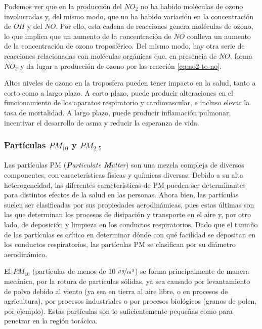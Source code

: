 \documentclass[12pt]{article}
\begin{document}
Podemos ver que en la producción del $NO_{2}$ no ha habido moléculas de ozono involucradas y, del mismo modo, que no ha habido variación en la concentración de $OH$ y del $NO$. Por ello, esta cadena de reacciones genera moléculas de ozono, lo que implica que un aumento de la concentración de $NO$ conlleva un aumento de la concentración de ozono troposférico. Del mismo modo, hay otra serie de reacciones relacionadas con moléculas orgánicas que, en presencia de $NO$, forma $NO_{2}$ y da lugar a producción de ozono por las reacción \ref{eq:no2-to-no}.

Altos niveles de ozono en la troposfera pueden tener impacto en la salud, tanto a corto como a largo plazo. A corto plazo, puede producir alteraciones en el funcionamiento de los aparatos respiratorio y cardiovascular, e incluso elevar la tasa de mortalidad. A largo plazo, puede producir inflamación pulmonar, incentivar el desarrollo de asma y reducir la esperanza de vida. 

\subsubsection*{Partículas \textbf{\texorpdfstring{$PM_{10}$}{PM10}} y \textbf{\texorpdfstring{$PM_{2,5}$}{PM2,5}}}
%

Las partículas PM (\textit{\textbf{P}articulate \textbf{M}atter}) son una mezcla compleja de diversos componentes, con características físicas y químicas diversas. Debido a su alta heterogeneidad, las diferentes características de PM pueden ser determinantes para distintos efectos de la salud en las personas. Ahora bien, las partículas suelen ser clasificadas por sus propiedades aerodinámicas, pues estas últimas son las que determinan los procesos de disipación y transporte en el aire y, por otro lado, de deposición y limpieza en los conductos respiratorios. Dado que el tamaño de las partículas es crítico en determinar dónde con qué facilidad se depositan en los conductos respiratorios, las partículas PM se clasifican por su diámetro aerodinámico.

El $PM_{10}$ (partículas de menos de 10 $\nicefrac{\mu g}{m^3}$) se forma principalmente de manera mecánica, por la rotura de partículas sólidas, ya sea causado por levantamiento de polvo debido al viento (ya sea en tierra al aire libre, o en procesos de agricultura), por procesos industriales o por procesos biológicos (granos de polen, por ejemplo). Estas partículas son lo suficientemente pequeñas como para penetrar en la región torácica.
\end{document}
